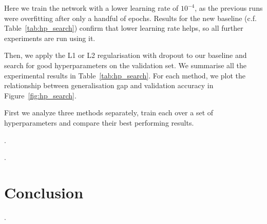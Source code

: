 \documentclass{article}
\begin{document}
Here we train the network with a lower learning rate of $10^{-4}$, as the previous runs were overfitting after only a handful of epochs. 
Results for the new baseline (c.f. Table~\ref{tab:hp_search}) confirm that lower learning rate helps, so all further experiments are run using it.

Then, we apply the L1 or L2 regularisation with dropout to our baseline and search for good hyperparameters on the validation set. 
We summarise all the experimental results in Table~\ref{tab:hp_search}. For each method, we plot the relationship between generalisation gap and validation accuracy in Figure~\ref{fig:hp_search}.

First we analyze three methods separately, train each over a set of hyperparameters and compare their best performing results.

\questionThirteen.

\questionFourteen.


\section{Conclusion}
\label{sec:concl}
    
\questionFifteen.

\newpage

\end{document}
